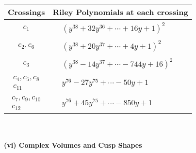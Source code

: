 \documentclass[1p]{elsarticle_modified}
\theoremstyle{definition}
\begin{document}
\begin{tabular}{m{50pt}|m{274pt}}
Crossings & \hspace{64pt}Riley Polynomials at each crossing \\
\hline $$\begin{aligned}c_{1}\end{aligned}$$&$\begin{aligned}
&(y^{38}+32 y^{36}+\cdots+16 y+1)^{2}
\end{aligned}$\\
\hline $$\begin{aligned}c_{2},c_{6}\end{aligned}$$&$\begin{aligned}
&(y^{38}+20 y^{37}+\cdots+4 y+1)^{2}
\end{aligned}$\\
\hline $$\begin{aligned}c_{3}\end{aligned}$$&$\begin{aligned}
&(y^{38}-14 y^{37}+\cdots-744 y+16)^{2}
\end{aligned}$\\
\hline $$\begin{aligned}c_{4},c_{5},c_{8}\\c_{11}\end{aligned}$$&$\begin{aligned}
&y^{76}-27 y^{75}+\cdots-50 y+1
\end{aligned}$\\
\hline $$\begin{aligned}c_{7},c_{9},c_{10}\\c_{12}\end{aligned}$$&$\begin{aligned}
&y^{76}+45 y^{75}+\cdots-850 y+1
\end{aligned}$\\
\hline
\end{tabular}\\~\\
\newpage\flushleft \textbf{(vi) Complex Volumes and Cusp Shapes}
\end{document}
